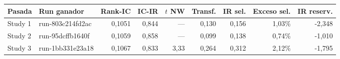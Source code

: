 \begin{tabular}{llrrrrrrr}
\toprule
Pasada & Run ganador & Rank-IC & IC-IR & $t$ NW & Transf. & IR sel. & Exceso sel. & IR reserv. \\
\midrule
Study 1 & run-803c214fd2ac & 0,1051 & 0,844 & — & 0,130 & 0,156 & 1,03\% & -2,348 \\
Study 2 & run-95dcffb1640f & 0,1059 & 0,858 & — & 0,099 & 0,138 & 0,74\% & -1,010 \\
Study 3 & run-1bb331e23a18 & 0,1067 & 0,833 & 3,33 & 0,264 & 0,312 & 2,12\% & -1,795 \\
\bottomrule
\end{tabular}
